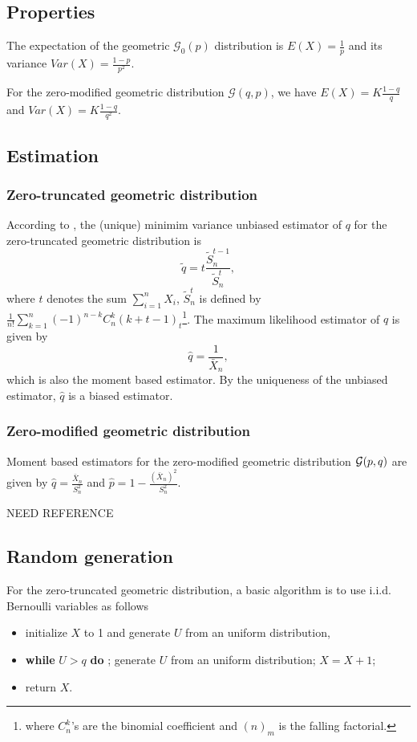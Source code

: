 \subsection{Properties}
The expectation of the geometric $\mathcal G_0(p)$ distribution is $E(X)=\frac{1}{p}$ and its variance $Var(X)=\frac{1-p}{p^2}$.

For the zero-modified geometric distribution $\mathcal G(q,p)$, we have $E(X) = K\frac{1-q}{q}$ and $Var(X)=K\frac{1-q}{q^2}$.

\subsection{Estimation}
\subsubsection{Zero-truncated geometric distribution}
According to \cite{cacoullos}, the (unique) minimim variance unbiased estimator of $q$ for the zero-truncated geometric distribution is 
$$
\tilde q = t \frac{\tilde S_n^{t-1}}{\tilde S_n^t},
$$
where $t$ denotes the sum $\sum_{i=1}^n X_i$, $\tilde S_n^t$ is defined by $\frac{1}{n!}\sum_{k=1}^n(-1)^{n-k} C_n^k(k+t-1)_t$\footnote{where $C_n^k$'s are the binomial coefficient and $(n)_m$ is the falling factorial.}. The maximum likelihood estimator of $q$ is given by
$$
\hat q = \frac{1}{\bar X_n},
$$
which is also the moment based estimator. By the uniqueness of the unbiased estimator, $\hat q$ is a biased estimator.

\subsubsection{Zero-modified geometric distribution}
Moment based estimators for the zero-modified geometric distribution $\mathcal G(p,q)$ are given by
$\hat q = \frac{\bar X_n}{S_n^2}$ and $\hat p = 1-\frac{(\bar X_n)^2}{S_n^2}$.

NEED REFERENCE

\subsection{Random generation}
For the zero-truncated geometric distribution, a basic algorithm is to use i.i.d. Bernoulli variables as follows
\begin{itemize}
\item initialize $X$ to 1 and generate $U$ from an uniform distribution,
\item \textbf{while} $U>q$ \textbf{do} ; generate $U$ from an uniform distribution; $X=X+1$; 
\item return $X$.
\end{itemize}

